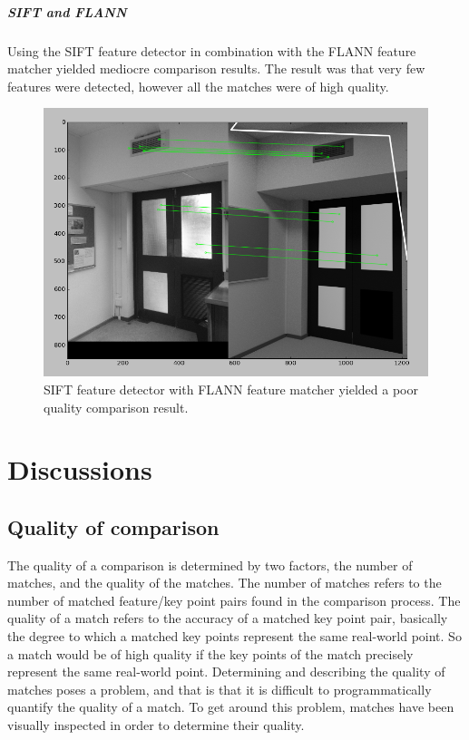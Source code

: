 \documentclass[11pt,a4paper]{report}
\begin{document}
				\paragraph{SIFT and FLANN}
					Using the SIFT feature detector in combination with the FLANN feature matcher yielded mediocre comparison results. The result was that very few features were detected, however all the matches were of high quality.
					\begin{figure}[H]
						\centering
						\includegraphics[width=1\textwidth]{sift_and_flann_results}
						\caption[SIFT and FLANN]{SIFT feature detector with FLANN feature matcher yielded a poor quality comparison result.}
						\label{fig:sift_and_flann_results}
					\end{figure}

\chapter{Discussions}
	\section{Quality of comparison}
	\label{comparison_quality}
		The quality of a comparison is determined by two factors, the number of matches, and the quality of the matches. The number of matches refers to the number of matched feature/key point pairs found in the comparison process. The quality of a match refers to the accuracy of a matched key point pair, basically the degree to which a matched key points represent the same real-world point. So a match would be of high quality if the key points of the match precisely represent the same real-world point.
		Determining and describing the quality of matches poses a problem, and that is that it is difficult to programmatically quantify the quality of a match. To get around this problem, matches have been visually inspected in order to determine their quality.
\end{document}
